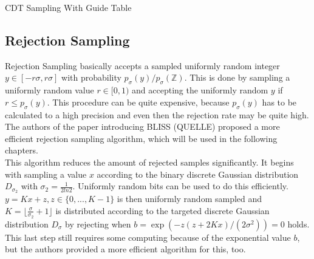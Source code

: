  \begin{algorithm}
 	\caption{CDT Sampling With Guide Table}
 	\label{algcdt}
 	\begin{algorithmic}[1]
	 		\State
	 	\EndIf
				\State
				\Else
			\EndIf	
		\EndWhile
 	\end{algorithmic}
 \end{algorithm}
\subsection{Rejection Sampling}
Rejection Sampling basically accepts a sampled uniformly random integer $y \in [-r\sigma, r\sigma]$ with probability $p_\sigma(y)/p_\sigma(\mathbb{Z})$. This is done by sampling a uniformly random value $r \in [0,1)$ and accepting the uniformly random $y$ if $r \le p_\sigma(y)$. This procedure can be quite expensive, because $p_\sigma(y)$ has to be calculated to a high precision and even then the rejection rate may be quite high.\\
The authors of the paper introducing BLISS (QUELLE) proposed a more efficient rejection sampling algorithm, which will be used in the following chapters.\\
This algorithm reduces the amount of rejected samples significantly. It begins with sampling a value $x$ according to the binary discrete Gaussian distribution $D_{\sigma 	_{2}}$ with $\sigma _2 = \frac{1}{2 ln 2}$. Uniformly random bits can be used to do this efficiently. $y = Kx + z, z \in \{0,...,K-1\}$ is then uniformly random sampled and $K = \lfloor\frac{\sigma}{\sigma _2} + 1\rfloor$ is distributed according to the targeted discrete Gaussian distribution $D_\sigma$ by rejecting when $b = \exp (−z(z + 2Kx)/(2σ^2)) = 0$ holds.\\
This last step still requires some computing because of the exponential value $b$, but the authors provided a more efficient algorithm for this, too. 


